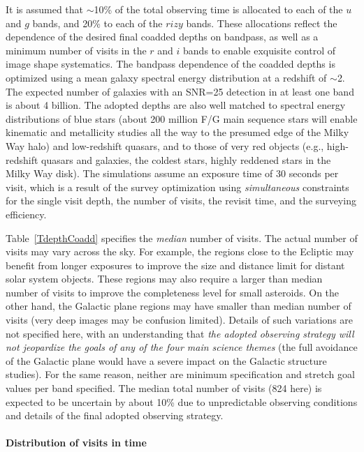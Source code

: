 It is assumed that $\sim$10\% of the total observing time is allocated to
each of the $u$ and $g$ bands, and 20\% to each of the $rizy$ bands. These allocations
reflect the dependence of the desired final coadded depths on bandpass,
as well as a minimum number of visits in the $r$ and $i$ bands to enable
exquisite control of image shape systematics. The bandpass dependence of
the coadded depths is optimized using a mean galaxy spectral energy
distribution at a redshift of $\sim$2. The expected number of galaxies
with an SNR=25 detection in at least one band is about 4 billion. The adopted
depths are also well matched to spectral energy distributions of blue stars
(about 200 million F/G main sequence stars will enable kinematic and
metallicity studies all the way to the presumed edge of the Milky Way halo)
and low-redshift quasars, and to those of very red objects (e.g., high-redshift
quasars and galaxies, the coldest stars, highly reddened stars in the Milky
Way disk). The simulations assume an exposure time of 30 seconds per visit,
which is a result of the survey optimization using {\it simultaneous}
constraints for the single visit depth, the number of visits, the revisit
time, and the surveying efficiency.

Table~\ref{TdepthCoadd} specifies the {\it median} number of visits. The actual
number of visits may vary across the sky. For example, the regions close to
the Ecliptic may benefit from longer exposures to improve the size and distance
limit for distant solar system objects. These regions may also require a
larger than median number of visits to improve
the completeness level for small asteroids. On the other hand, the Galactic
plane regions may have smaller than median number of visits (\eg very deep
images may be confusion limited). Details of such variations are not specified
here, with an understanding that {\it the adopted observing strategy will not
jeopardize the goals of any of the four main science themes} (\eg the full
avoidance of the Galactic plane would have a severe impact on the Galactic
structure studies). For the same reason, neither are minimum specification
and stretch goal values per band specified. The median total number of visits
(824 here) is expected to be uncertain by about 10\% due to unpredictable
observing conditions and details of the final adopted observing strategy.



\paragraph{Distribution of visits in time\\}

